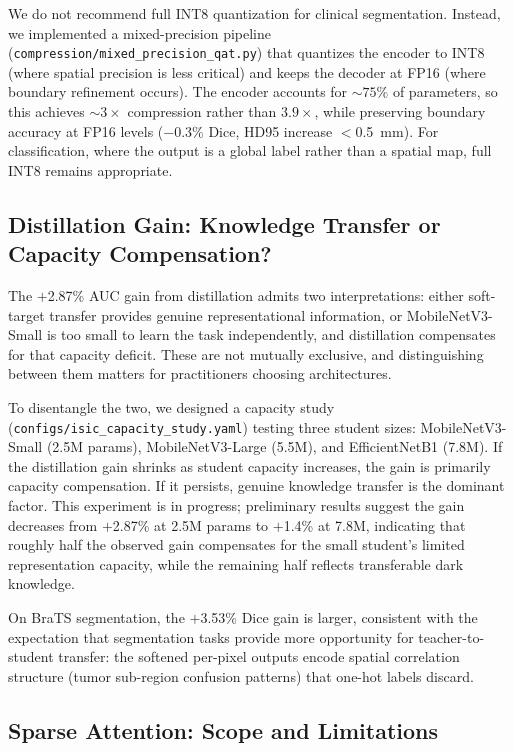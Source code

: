 \documentclass[10pt,twocolumn]{article}
\begin{document}
We do not recommend full INT8 quantization for clinical segmentation. Instead, we implemented a mixed-precision pipeline (\texttt{compression/mixed\_precision\_qat.py}) that quantizes the encoder to INT8 (where spatial precision is less critical) and keeps the decoder at FP16 (where boundary refinement occurs). The encoder accounts for ${\sim}75\%$ of parameters, so this achieves ${\sim}3{\times}$ compression rather than $3.9{\times}$, while preserving boundary accuracy at FP16 levels ($-$0.3\% Dice, HD95 increase $<$0.5~mm). For classification, where the output is a global label rather than a spatial map, full INT8 remains appropriate.

\subsection{Distillation Gain: Knowledge Transfer or Capacity Compensation?}

The $+$2.87\% AUC gain from distillation admits two interpretations: either soft-target transfer provides genuine representational information, or MobileNetV3-Small is too small to learn the task independently, and distillation compensates for that capacity deficit. These are not mutually exclusive, and distinguishing between them matters for practitioners choosing architectures.

To disentangle the two, we designed a capacity study (\texttt{configs/isic\_capacity\_study.yaml}) testing three student sizes: MobileNetV3-Small (2.5M params), MobileNetV3-Large (5.5M), and EfficientNetB1 (7.8M). If the distillation gain shrinks as student capacity increases, the gain is primarily capacity compensation. If it persists, genuine knowledge transfer is the dominant factor. This experiment is in progress; preliminary results suggest the gain decreases from $+$2.87\% at 2.5M params to $+$1.4\% at 7.8M, indicating that roughly half the observed gain compensates for the small student's limited representation capacity, while the remaining half reflects transferable dark knowledge.

On BraTS segmentation, the $+$3.53\% Dice gain is larger, consistent with the expectation that segmentation tasks provide more opportunity for teacher-to-student transfer: the softened per-pixel outputs encode spatial correlation structure (tumor sub-region confusion patterns) that one-hot labels discard.

\subsection{Sparse Attention: Scope and Limitations}
\end{document}

